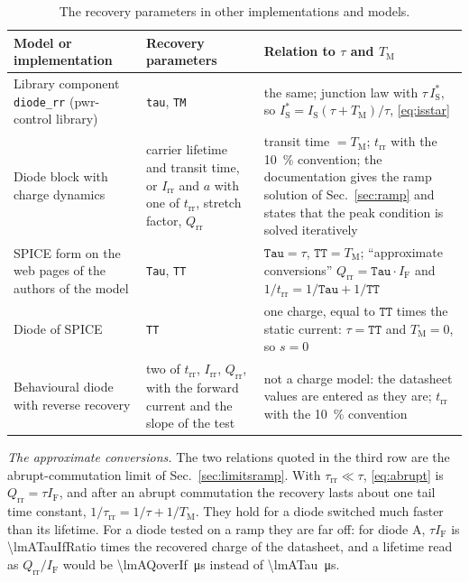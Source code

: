 \documentclass[10pt,a4paper]{scrartcl}
\newcommand{\IF}{I_\mathrm{F}}
\newcommand{\Irr}{I_\mathrm{rr}}
\newcommand{\Qrr}{Q_\mathrm{rr}}
\newcommand{\trr}{t_\mathrm{rr}}
\newcommand{\taurr}{\tau_\mathrm{rr}}
\newcommand{\TM}{T_\mathrm{M}}
\newcommand{\IS}{I_\mathrm{S}}
\begin{document}
\begin{table}[htb]
\centering\small
\caption{The recovery parameters in other implementations and models.}
\label{tab:others}
\begin{tabular}{@{}>{\raggedright\arraybackslash}p{4.6cm}>{\raggedright\arraybackslash}p{4.2cm}>{\raggedright\arraybackslash}p{7.2cm}@{}}
\toprule
Model or implementation & Recovery parameters & Relation to $\tau$ and $\TM$ \\
\midrule
Library component \texttt{diode\_rr} (pwr-control library) & \texttt{tau}, \texttt{TM} & the same; junction law with $\tau\,\IS^{*}$, so $\IS^{*} = \IS(\tau+\TM)/\tau$, \eqref{eq:isstar} \\
\addlinespace
Diode block with charge dynamics \cite{mathworks} & carrier lifetime and transit time, or $\Irr$ and $a$ with one of $\trr$, stretch factor, $\Qrr$ & transit time $= \TM$; $\trr$ with the \SI{10}{\percent} convention; the documentation gives the ramp solution of Sec.~\ref{sec:ramp} and states that the peak condition is solved iteratively \\
\addlinespace
SPICE form on the web pages of the authors of the model \cite{pemodels} & \texttt{Tau}, \texttt{TT} & $\texttt{Tau} = \tau$, $\texttt{TT} = \TM$; ``approximate conversions'' $\Qrr = \texttt{Tau}\cdot\IF$ and $1/\trr = 1/\texttt{Tau} + 1/\texttt{TT}$ \\
\addlinespace
Diode of SPICE & \texttt{TT} & one charge, equal to $\texttt{TT}$ times the static current: $\tau = \texttt{TT}$ and $\TM = 0$, so $s = 0$ \\
\addlinespace
Behavioural diode with reverse recovery \cite{plecs} & two of $\trr$, $\Irr$, $\Qrr$, with the forward current and the slope of the test & not a charge model: the datasheet values are entered as they are; $\trr$ with the \SI{10}{\percent} convention \\
\bottomrule
\end{tabular}
\end{table}

\emph{The approximate conversions.} The two relations quoted in the third row are the abrupt-commutation limit of Sec.~\ref{sec:limitsramp}. With $\taurr \ll \tau$, \eqref{eq:abrupt} is $\Qrr = \tau\IF$, and after an abrupt commutation the recovery lasts about one tail time constant, $1/\taurr = 1/\tau + 1/\TM$. They hold for a diode switched much faster than its lifetime. For a diode tested on a ramp they are far off: for diode A, $\tau\IF$ is \num{\lmATauIfRatio} times the recovered charge of the datasheet, and a lifetime read as $\Qrr/\IF$ would be \SI{\lmAQoverIf}{\micro\second} instead of \SI{\lmATau}{\micro\second}.
\end{document}
